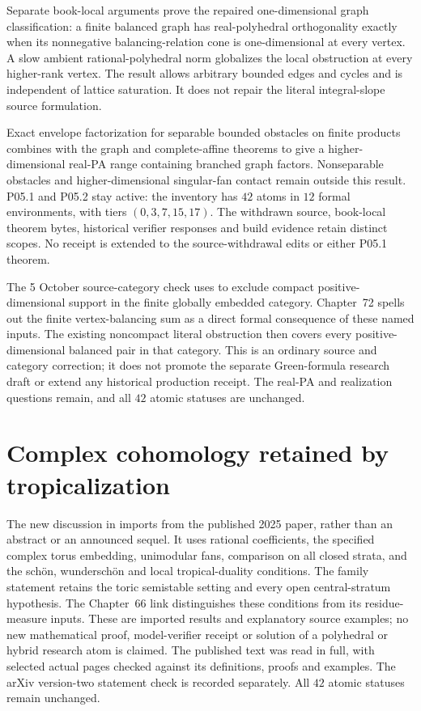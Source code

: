 Separate book-local arguments prove the repaired one-dimensional graph
classification: a finite balanced graph has real-polyhedral orthogonality
exactly when its nonnegative balancing-relation cone is one-dimensional at
every vertex.  A slow ambient rational-polyhedral norm globalizes the local
obstruction at every higher-rank vertex.  The result allows arbitrary bounded
edges and cycles and is independent of lattice saturation.  It does not
repair the literal integral-slope source formulation.

Exact envelope factorization for separable bounded obstacles on finite
products combines with the graph and complete-affine theorems to give a
higher-dimensional real-PA range containing branched graph factors.
Nonseparable obstacles and higher-dimensional singular-fan contact remain
outside this result. P05.1 and P05.2 stay active: the inventory has \(42\)
atoms in \(12\) formal environments, with tiers \((0,3,7,15,17)\).
The withdrawn source, book-local theorem bytes, historical verifier responses
and build evidence retain distinct scopes. No receipt is extended to the
source-withdrawal edits or either P05.1 theorem.

The 5 October source-category check uses
\cite[Definitions~2.2, 2.4 and~2.27, Proposition~3.11 and Lemma~3.25]{BMPS26}
to exclude compact positive-dimensional support in the finite globally
embedded category. Chapter~72 spells out the finite vertex-balancing sum
as a direct formal consequence of these named inputs. The existing
noncompact literal obstruction then covers every positive-dimensional
balanced pair in that category. This is an ordinary source and category
correction; it does not promote the separate Green-formula research draft
or extend any historical production receipt. The real-PA and realization
questions remain, and all $42$ atomic statuses are unchanged.

\section{Complex cohomology retained by tropicalization}
\label{sec:provenance-cohomologically-tropical}

The new discussion in  imports
\cite[Definitions~1.1, 1.2, 2.6 and~3.1, Theorems~4.4, 4.5, 6.1, 6.2
and~7.1, \S8.1 and \S8.2]{AAPS25Cohomologically} from the published
2025 paper, rather than an abstract or an announced sequel. It uses
rational coefficients, the specified complex torus embedding,
unimodular fans, comparison on all closed strata, and the sch\"on,
wundersch\"on and local tropical-duality conditions. The family statement
retains the toric semistable setting and every open central-stratum
hypothesis. The Chapter~66 link distinguishes these conditions from its
residue-measure inputs. These are imported results and explanatory source
examples; no new mathematical proof, model-verifier receipt or solution
of a polyhedral or hybrid research atom is claimed. The published text
was read in full, with selected actual pages checked against its
definitions, proofs and examples. The arXiv version-two statement check
is recorded separately. All $42$ atomic statuses remain unchanged.

